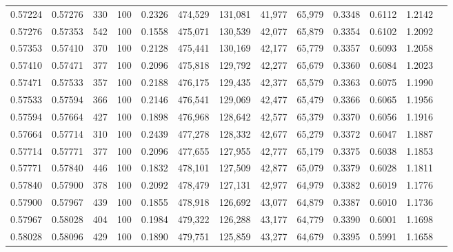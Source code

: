 \begin{tabular}{rrrrrrrrrrrrr}
0.57224 & 0.57276 &   330 & 100 &                                     0.2326 & 474,529 & 131,081 &  41,977 &  65,979 & 0.3348 & 0.6112 & 1.2142 \\
0.57276 & 0.57353 &   542 & 100 &                                     0.1558 & 475,071 & 130,539 &  42,077 &  65,879 & 0.3354 & 0.6102 & 1.2092 \\
0.57353 & 0.57410 &   370 & 100 &                                     0.2128 & 475,441 & 130,169 &  42,177 &  65,779 & 0.3357 & 0.6093 & 1.2058 \\
0.57410 & 0.57471 &   377 & 100 &                                     0.2096 & 475,818 & 129,792 &  42,277 &  65,679 & 0.3360 & 0.6084 & 1.2023 \\
0.57471 & 0.57533 &   357 & 100 &                                     0.2188 & 476,175 & 129,435 &  42,377 &  65,579 & 0.3363 & 0.6075 & 1.1990 \\
0.57533 & 0.57594 &   366 & 100 &                                     0.2146 & 476,541 & 129,069 &  42,477 &  65,479 & 0.3366 & 0.6065 & 1.1956 \\
0.57594 & 0.57664 &   427 & 100 &                                     0.1898 & 476,968 & 128,642 &  42,577 &  65,379 & 0.3370 & 0.6056 & 1.1916 \\
0.57664 & 0.57714 &   310 & 100 &                                     0.2439 & 477,278 & 128,332 &  42,677 &  65,279 & 0.3372 & 0.6047 & 1.1887 \\
0.57714 & 0.57771 &   377 & 100 &                                     0.2096 & 477,655 & 127,955 &  42,777 &  65,179 & 0.3375 & 0.6038 & 1.1853 \\
0.57771 & 0.57840 &   446 & 100 &                                     0.1832 & 478,101 & 127,509 &  42,877 &  65,079 & 0.3379 & 0.6028 & 1.1811 \\
0.57840 & 0.57900 &   378 & 100 &                                     0.2092 & 478,479 & 127,131 &  42,977 &  64,979 & 0.3382 & 0.6019 & 1.1776 \\
0.57900 & 0.57967 &   439 & 100 &                                     0.1855 & 478,918 & 126,692 &  43,077 &  64,879 & 0.3387 & 0.6010 & 1.1736 \\
0.57967 & 0.58028 &   404 & 100 &                                     0.1984 & 479,322 & 126,288 &  43,177 &  64,779 & 0.3390 & 0.6001 & 1.1698 \\
0.58028 & 0.58096 &   429 & 100 &                                     0.1890 & 479,751 & 125,859 &  43,277 &  64,679 & 0.3395 & 0.5991 & 1.1658 \\

\end{tabular}
